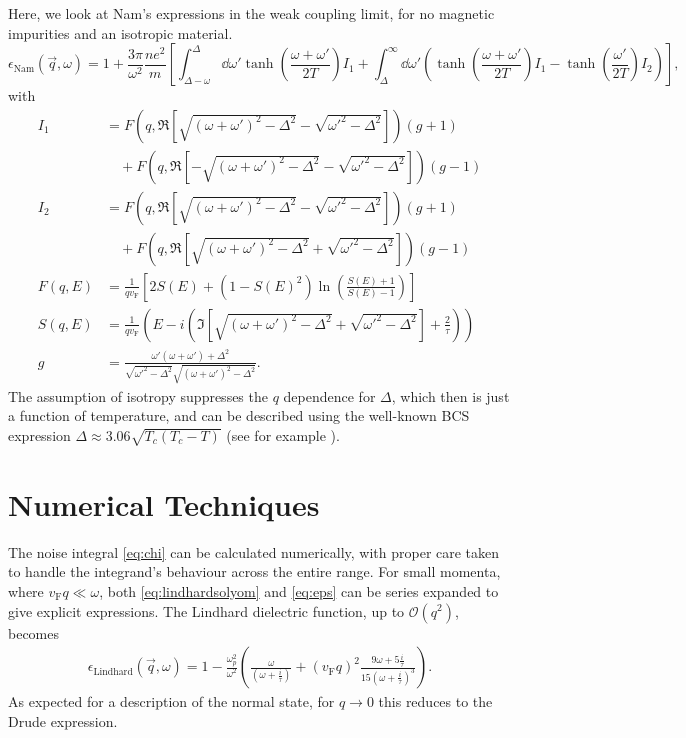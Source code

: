 \documentclass{article}
\newcommand{\vf}{v_{\mathrm{F}}}
\begin{document}
Here, we look at Nam's expressions in the weak coupling limit, for no magnetic impurities and an isotropic material.
\begin{equation}
	\epsilon_{\mathrm{Nam}}(\vec{q}, \omega) = 1 + \frac{3 \pi}{\omega^2} \frac{n e^2}{m} \left[\int_{\Delta - \omega}^{\Delta}\dd{\omega'} \tanh(\frac{\omega + \omega'}{2 T}) I_1 + \int_{\Delta}^{\infty} \dd{\omega'} \left( \tanh(\frac{\omega + \omega'}{2 T}) I_1  - \tanh(\frac{\omega'}{2 T})I_2 \right) \right], \label{eq:eps}
\end{equation}
with
\begin{align}
	I_1 &= F(q, \Re[\sqrt{(\omega + \omega')^2 - \Delta^2} - \sqrt{\omega'^2 - \Delta^2}]) (g + 1) \nonumber\\
	&\quad + F(q, \Re[-\sqrt{(\omega + \omega')^2 - \Delta^2} - \sqrt{\omega'^2 - \Delta^2}]) (g - 1) \\
	I_2 &= F(q, \Re[\sqrt{(\omega + \omega')^2 - \Delta^2} - \sqrt{\omega'^2 - \Delta^2}]) (g + 1) \nonumber\\
	&\quad + F(q, \Re[\sqrt{(\omega +  \omega')^2 - \Delta^2} + \sqrt{\omega'^2 - \Delta^2}]) (g - 1) \\
	F(q, E) &= \frac{1}{q \vf} \left[2 S(E) + (1 - S(E)^2)\ln(\frac{S(E) + 1}{S(E) - 1})\right] \label{eq:NamF} \\
	S(q, E) &= \frac{1}{q \vf} \left( E - i \left(\Im[\sqrt{(\omega + \omega')^2 - \Delta^2} + \sqrt{\omega'^2 - \Delta^2}] + \frac{2}{\tau} \right) \right) \\
	g &= \frac{\omega' \left(\omega + \omega'\right) + \Delta^2}{\sqrt{\omega'^2 - \Delta^2}\sqrt{(\omega + \omega')^2 - \Delta^2}}.
\end{align}
The assumption of isotropy suppresses the $q$ dependence for $\Delta$, which then is just a function of temperature, and can be described using the well-known BCS expression $\Delta \approx 3.06 \sqrt{T_c(T_c - T)}$ (see for example \cite{Tinkham}).

\section{Numerical Techniques \label{sec:technical}}

The noise integral \eqref{eq:chi} can be calculated numerically, with proper care taken to handle the integrand's behaviour across the entire range.
For small momenta, where $\vf q \ll \omega$, both \eqref{eq:lindhardsolyom} and \eqref{eq:eps} can be series expanded to give explicit expressions.
The Lindhard dielectric function, up to $\mathcal{O}(q^2)$, becomes
\begin{gather}
	\epsilon_{\mathrm{Lindhard}}(\vec{q}, \omega) = 1 - \frac{\omega_p^2}{\omega^2} \left(\frac{\omega}{(\omega + \frac{i}{\tau})} + (\vf q)^2  \frac{9 \omega + 5 \frac{i}{\tau}}{15 (\omega + \frac{i}{\tau})^3} \right). \label{eq:lindhardsmallkseries}
\end{gather}
As expected for a description of the normal state, for $q \rightarrow 0$ this reduces to the Drude expression.
\end{document}
